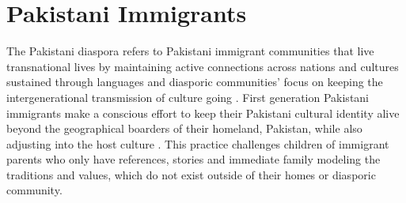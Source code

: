 \section{Pakistani Immigrants}

The Pakistani diaspora refers to Pakistani immigrant communities that live transnational lives by maintaining active connections across nations and cultures sustained through languages and diasporic communities’ focus on keeping the intergenerational transmission of culture going \citep{chaudharyTaleTwoGenerations2024, bhatiaTheorizingIdentityTransnational2009}. First generation Pakistani immigrants make a conscious effort to keep their Pakistani cultural identity alive beyond the geographical boarders of their homeland, Pakistan, while also adjusting into the host culture \citep{chaudharyTaleTwoGenerations2024}. This practice challenges children of immigrant parents who only have references, stories and immediate family modeling the traditions and values, which do not exist outside of their homes or diasporic community.

